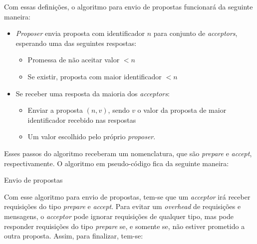 \documentclass[
    12pt,
    openright, 
    oneside,
    a4paper,
    french,
    english,
    brazil
    ]{facom-ufu-abntex2}
\theoremstyle{definition}
\begin{document}
Com essas definições, o algoritmo para envio de propostas funcionará da seguinte maneira:

\begin{itemize}
    \item[]\textit{Proposer} envia proposta com identificador $n$ para conjunto de 
\textit{acceptors}, esperando uma das seguintes respostas:

    \begin{itemize}
        \item[] Promessa de não aceitar valor $<n$
        \item[] Se existir, proposta com maior identificador $<n$
    \end{itemize}
    
    \item[]Se receber uma resposta da maioria dos \textit{acceptors}:
    \begin{itemize}
        \item[] Enviar a proposta $(n, v)$, sendo $v$ o valor da proposta de maior identificador
        recebido nas respostas
        \item[] Um valor escolhido pelo próprio \textit{proposer}.
    \end{itemize}
\end{itemize}

Esses passos do algoritmo receberam um nomenclatura, que são \textit{prepare} e
\textit{accept}, respectivamente. O algoritmo em pseudo-código fica da seguinte maneira:

\begin{algorithm}[H]
\caption{Envio de propostas}
\SetAlgoLined
{}
\end{algorithm}

Com esse algoritmo para envio de propostas, tem-se que um \textit{acceptor} irá
receber requisições do tipo \textit{prepare} e \textit{accept}. Para evitar um \textit{overhead}
de requisições e mensagens, o \textit{acceptor} pode ignorar requisições de qualquer tipo,
mas pode responder requisições do tipo \textit{prepare} se, e somente se, não estiver
prometido a outra proposta. Assim, para finalizar, tem-se:
\end{document}
